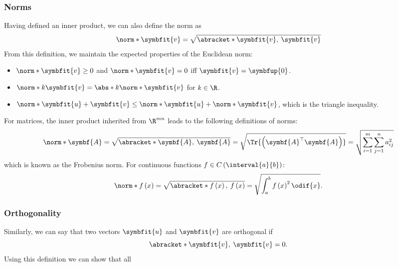 \documentclass{article}
\begin{document}
\begin{multicols*}{3}
    \subsubsection{Norms}
    Having defined an inner product, we can also define the norm as
    \begin{equation*}
        \norm*{\symbfit{v}} = \sqrt{\abracket*{\symbfit{v},\: \symbfit{v}}}
    \end{equation*}
    From this definition, we maintain the expected properties of the Euclidean norm:
    \begin{itemize}
        \item \(\norm*{\symbfit{v}} \geq 0\) and \(\norm*{\symbfit{v}} = 0\) iff \(\symbfit{v} = \symbfup{0}\).
        \item \(\norm*{k \symbfit{v}} = \abs*{k} \norm*{\symbfit{v}}\) for \(k \in \R\).
        \item \(\norm*{\symbfit{u} + \symbfit{v}} \leq \norm*{\symbfit{u}} + \norm*{\symbfit{v}}\), which is the triangle inequality.
    \end{itemize}
    For matrices, the inner product inherited from \(\R^{mn}\) leads to the following definitions of norms:
    \begin{equation*}
        \norm*{\symbf{A}} = \sqrt{\abracket*{\symbf{A},\: \symbf{A}}} = \sqrt{\Tr{\left( \symbf{A}^\top \symbf{A} \right)}} = \sqrt{\sum_{i = 1}^m \sum_{j = 1}^n a_{ij}^2}
    \end{equation*}
    which is known as the Frobenius norm. For continuous functions \(f \in C\left( \interval{a}{b} \right)\):\
    \begin{equation*}
        \norm*{f\left( x \right)} = \sqrt{\abracket*{f\left( x \right),\: f\left( x \right)}} = \sqrt{\int_a^b f\left( x \right)^2 \odif{x}}.
    \end{equation*}
    \subsubsection{Orthogonality}
    Similarly, we can say that two vectors \(\symbfit{u}\) and \(\symbfit{v}\) are orthogonal if
    \begin{equation*}
        \abracket*{\symbfit{v},\: \symbfit{v}} = 0.
    \end{equation*}
    Using this definition we can show that all
\end{multicols*}
\end{document}
